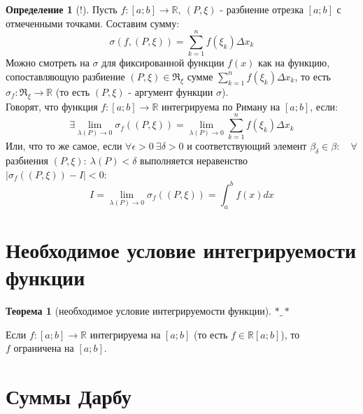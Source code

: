 \documentclass{report}
\theoremstyle{definition}
\newtheorem*{definition}{Определение}
\newtheorem*{theorem}{Теорема}
\begin{document}
\begin{definition}[!]
    Пусть $f:[a;b]\rightarrow\mathbb{R}, \ (P,\xi)$ - разбиение отрезка $[a;b]$ с отмеченными точками. Составим сумму:
    \begin{equation*}
        \sigma(f,(P,\xi)) = \sum_{k=1}^{n}f(\xi_{k})\Delta x_{k}
    \end{equation*}
    Можно смотреть на $\sigma$ для фиксированной функции $f(x)$ как на функцию, сопоставляющую разбиение $(P,\xi)\in
        \Re_{\xi}$ сумме $\sum_{k=1}^{n}f(\xi_{k})\Delta x_{k}$, то есть $\sigma_{f}:\Re_{\xi}\rightarrow\mathbb{R}$
    (то есть $(P,\xi)$ - аргумент функции $\sigma$).\\

    Говорят, что функция $f:[a;b]\rightarrow\mathbb{R}$ интегрируема по Риману на $[a;b]$, если:
    \begin{equation*}
        \exists\underset{\lambda(P)\rightarrow0}{\lim}\sigma_{f}((P,\xi)) = \underset{\lambda(P)\rightarrow0}{\lim}
        \sum_{k=1}^{n}f(\xi_{k})\Delta x_{k}
    \end{equation*}
    Или, что то же самое, если $\forall\epsilon>0 \ \exists\delta>0$ и соответствующий элемент $\beta_{\delta} \in
        \beta:\quad \forall$ разбиения $(P,\xi): \ \lambda(P) < \delta$ выполняется неравенство \\ $| \sigma_{f}
        ((P,\xi)) - I | < 0$:
    \begin{equation*}
        I = \underset{\lambda(P)\rightarrow0}{\lim}\sigma_{f}((P,\xi)) = \int_{a}^{b}f(x)dx
    \end{equation*}
\end{definition}

\section{Необходимое условие интегрируемости функции}

\begin{theorem}[необходимое условие интегрируемости функции]
    $*\_*$

    Если $f:[a;b]\rightarrow\mathbb{R}$ интегрируема на $[a;b]$ (то есть $f\in\mathbb{R}[a;b]$), то \\ $f$
    ограничена на $[a;b]$.
\end{theorem}

\section{Суммы Дарбу}
\end{document}

